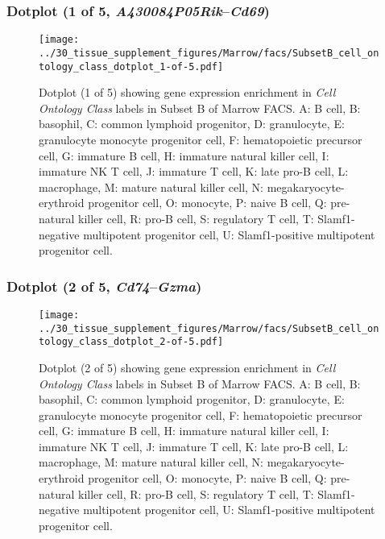 \subsubsection{Dotplot (1 of 5, \emph{A430084P05Rik}--\emph{Cd69})}
\begin{figure}[h]
\centering
\texttt{[image: ../30\_tissue\_supplement\_figures/Marrow/facs/SubsetB\_cell\_ontology\_class\_dotplot\_1-of-5.pdf]}

\caption{ Dotplot (1 of 5)  showing gene expression enrichment in \emph{Cell Ontology Class} labels in Subset B of Marrow FACS. A: B cell, B: basophil, C: common lymphoid progenitor, D: granulocyte, E: granulocyte monocyte progenitor cell, F: hematopoietic precursor cell, G: immature B cell, H: immature natural killer cell, I: immature NK T cell, J: immature T cell, K: late pro-B cell, L: macrophage, M: mature natural killer cell, N: megakaryocyte-erythroid progenitor cell, O: monocyte, P: naive B cell, Q: pre-natural killer cell, R: pro-B cell, S: regulatory T cell, T: Slamf1-negative multipotent progenitor cell, U: Slamf1-positive multipotent progenitor cell.}
\end{figure}


\clearpage

\subsubsection{Dotplot (2 of 5, \emph{Cd74}--\emph{Gzma})}
\begin{figure}[h]
\centering
\texttt{[image: ../30\_tissue\_supplement\_figures/Marrow/facs/SubsetB\_cell\_ontology\_class\_dotplot\_2-of-5.pdf]}

\caption{ Dotplot (2 of 5)  showing gene expression enrichment in \emph{Cell Ontology Class} labels in Subset B of Marrow FACS. A: B cell, B: basophil, C: common lymphoid progenitor, D: granulocyte, E: granulocyte monocyte progenitor cell, F: hematopoietic precursor cell, G: immature B cell, H: immature natural killer cell, I: immature NK T cell, J: immature T cell, K: late pro-B cell, L: macrophage, M: mature natural killer cell, N: megakaryocyte-erythroid progenitor cell, O: monocyte, P: naive B cell, Q: pre-natural killer cell, R: pro-B cell, S: regulatory T cell, T: Slamf1-negative multipotent progenitor cell, U: Slamf1-positive multipotent progenitor cell.}
\end{figure}


\clearpage


